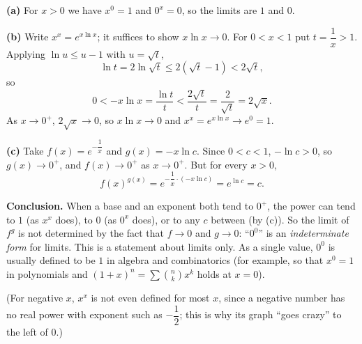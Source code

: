 \textbf{(a)} For $x>0$ we have $x^0=1$ and $0^x=0$, so the limits are $1$ and $0$.

\textbf{(b)} Write $x^x=e^{x\ln x}$; it suffices to show $x\ln x\to0$. For $0<x<1$ put $t=\dfrac1x>1$. Applying $\ln u\le u-1$ with $u=\sqrt t$,
\[\ln t=2\ln\sqrt t\le2\left(\sqrt t-1\right)<2\sqrt t,\]
so
\[0<-x\ln x=\dfrac{\ln t}{t}<\dfrac{2\sqrt t}{t}=\dfrac{2}{\sqrt t}=2\sqrt x.\]
As $x\to0^+$, $2\sqrt x\to0$, so $x\ln x\to0$ and $x^x=e^{x\ln x}\to e^0=\boxed{1}$.

\textbf{(c)} Take $f(x)=e^{-\dfrac1x}$ and $g(x)=-x\ln c$. Since $0<c<1$, $-\ln c>0$, so $g(x)\to0^+$, and $f(x)\to0^+$ as $x\to0^+$. But for every $x>0$,
\[f(x)^{g(x)}=e^{-\dfrac1x\cdot\left(-x\ln c\right)}=e^{\ln c}=c.\]

\textbf{Conclusion.} When a base and an exponent both tend to $0^+$, the power can tend to $1$ (as $x^x$ does), to $0$ (as $0^x$ does), or to any $c$ between (by (c)). So the limit of $f^g$ is not determined by the fact that $f\to0$ and $g\to0$: ``$0^0$'' is an \emph{indeterminate form} for limits. This is a statement about limits only. As a single value, $0^0$ is usually defined to be $1$ in algebra and combinatorics (for example, so that $x^0=1$ in polynomials and $(1+x)^n=\sum\binom nk x^k$ holds at $x=0$).

(For negative $x$, $x^x$ is not even defined for most $x$, since a negative number has no real power with exponent such as $-\dfrac12$; this is why its graph ``goes crazy'' to the left of $0$.)

